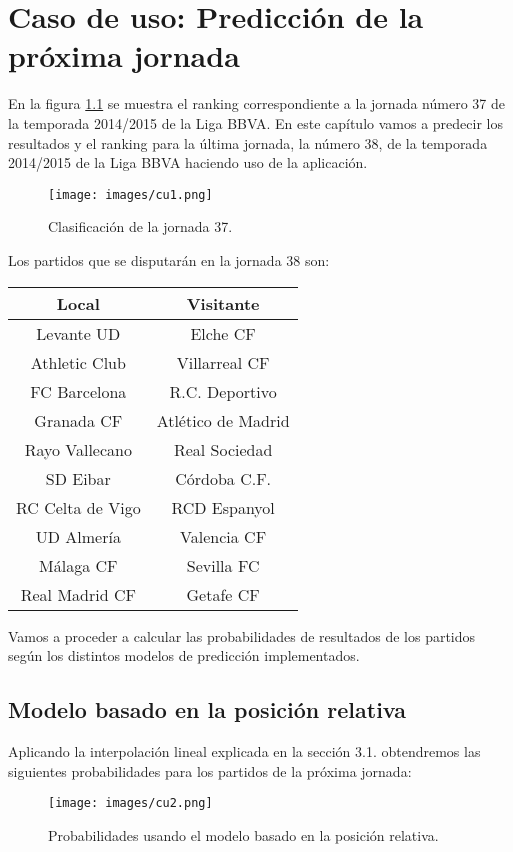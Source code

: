 
\chapter{Caso de uso: Predicción de la próxima jornada}

En la figura \ref{fig:clas37} se muestra el ranking correspondiente a la jornada número 37 de la temporada 2014/2015 de la Liga BBVA. En este capítulo vamos a predecir los resultados y el ranking para la última jornada, la número 38, de la temporada 2014/2015 de la Liga BBVA haciendo uso de la aplicación.
\begin{figure}[H]
	\centering
	\texttt{[image: images/cu1.png]}
	\caption{Clasificación de la jornada 37.} \label{fig:clas37}
\end{figure}

 Los partidos que se disputarán en la jornada 38 son:
\begin{center}
	\begin{tabular}{|c|c|}
	\hline \rowcolor{ao} Local & Visitante \\ 
	\hline Levante UD & Elche CF \\ 
	\hline Athletic Club & Villarreal CF \\ 
	\hline FC Barcelona & R.C. Deportivo \\ 
	\hline Granada CF & Atlético de Madrid \\ 
	\hline Rayo Vallecano & Real Sociedad \\ 
	\hline SD Eibar & Córdoba C.F. \\ 
	\hline RC Celta de Vigo & RCD Espanyol \\ 
	\hline UD Almería & Valencia CF \\ 
	\hline Málaga CF & Sevilla FC \\ 
	\hline Real Madrid CF & Getafe CF \\ 
	\hline 
\end{tabular} 
\end{center}

Vamos a proceder a calcular las probabilidades de resultados de los partidos según los distintos modelos de predicción implementados.

\section{Modelo basado en la posición relativa}
Aplicando la interpolación lineal explicada en la sección 3.1. obtendremos las siguientes probabilidades para los partidos de la próxima jornada:
\begin{figure}[H]
	\centering
	\texttt{[image: images/cu2.png]}
	\caption{Probabilidades usando el modelo basado en la posición relativa.} \label{fig:pred1}
\end{figure}

